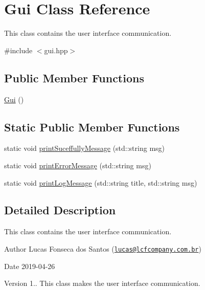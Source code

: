 \hypertarget{classGui}{}\section{Gui Class Reference}
\label{classGui}


This class contains the user interface communication.  




{\ttfamily \#include $<$gui.\+hpp$>$}

\subsection*{Public Member Functions}
\begin{DoxyCompactItemize}
\item 
\mbox{\hyperlink{classGui_ab2655dbb6d3a91d7e90cb83dad6c0450}{Gui}} ()
\end{DoxyCompactItemize}
\subsection*{Static Public Member Functions}
\begin{DoxyCompactItemize}
\item 
static void \mbox{\hyperlink{classGui_ac71b24eae15306196c84bf2cbf3281a0}{print\+Suceffully\+Message}} (std\+::string msg)
\item 
static void \mbox{\hyperlink{classGui_ad51e4b65b71248dd6b82d1fc8518f7d3}{print\+Error\+Message}} (std\+::string msg)
\item 
static void \mbox{\hyperlink{classGui_ad2532ed126d799538a1ee30c2d5ec9ac}{print\+Log\+Message}} (std\+::string title, std\+::string msg)
\end{DoxyCompactItemize}


\subsection{Detailed Description}
This class contains the user interface communication. 

\begin{DoxyAuthor}{Author}
Lucas Fonseca dos Santos (\href{mailto:lucas@lcfcompany.com.br}{\tt lucas@lcfcompany.\+com.\+br}) 
\end{DoxyAuthor}
\begin{DoxyDate}{Date}
2019-\/04-\/26 
\end{DoxyDate}
\begin{DoxyVersion}{Version}
1.. This class makes the user interface communication. 
\end{DoxyVersion}


